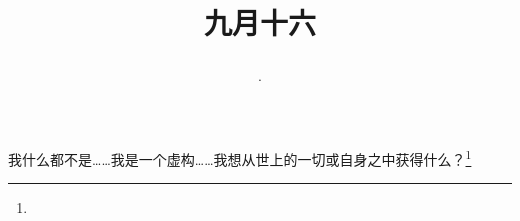 \title{\date[d=18,m=10,y=2024][year:cn-y,年,month:cn,day:cn,日,·,weekday]·九月十六 }
我什么都不是……我是一个虚构……我想从世上的一切或自身之中获得什么？\footnote{ }


